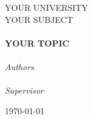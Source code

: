 \begin{titlepage}
  \begin{center}

    \textsc{\LARGE YOUR UNIVERSITY}\\[1.5 cm]
    \textsc{\Large YOUR SUBJECT}\\[0.5 cm]

    \HRule\\[0.4 cm]
    {\huge \bfseries YOUR TOPIC\\[0.4 cm]}
    \HRule\\[1.5 cm]

    \emph{Authors}\\[0.1 cm]
    \noindent{}\\[1 cm]

    \emph{Supervisor}
    \noindent{}

    \vfill

    {\large \today}

      \end{center}
    \end{titlepage}
